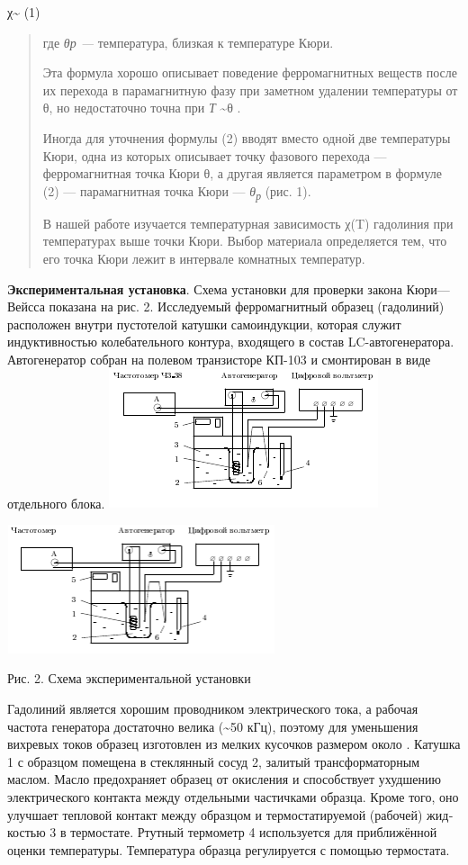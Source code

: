 \documentclass[]{article}
\begin{document}
χ\textasciitilde{} (1)

\begin{quote}
где \emph{θр ---} температура, близкая к температуре Кюри.

Эта формула хорошо описывает поведение ферромагнитных ве­ществ после их
перехода в парамагнитную фазу при заметном удалении температуры от θ, но
недостаточно точна при \emph{Т} \textasciitilde{}θ .

Иногда для уточнения формулы (2) вводят вместо одной две темпе­ратуры
Кюри, одна из которых описывает точку фазового перехода ---
ферромагнитная точка Кюри θ, а другая является параметром в фор­муле (2)
--- парамагнитная точка Кюри --- \emph{θ\textsubscript{р}} (рис. 1).

В нашей работе изучается температурная зависимость χ(T) гадоли­ния при
температурах выше точки Кюри. Выбор материала определяет­ся тем, что его
точка Кюри лежит в интервале комнатных температур.
\end{quote}

\textbf{Экспериментальная установка}. Схема установки для проверки
за­кона Кюри---Вейсса показана на рис. 2. Исследуемый ферромагнитный
образец (гадолиний) расположен внутри пустотелой катушки самоин­дукции,
которая служит индуктивностью колебательного контура, вхо­дящего в
состав LC-автогенератора. Автогенератор собран на полевом транзисторе
КП-103 и смонтирован в виде отдельного блока.
\includegraphics[width=3.11458in,height=1.61458in]{./media/image5.png}

\includegraphics[width=3.10000in,height=1.48542in]{./media/image6.png}

Рис. 2. Схема экспериментальной установки

Гадолиний является хорошим проводником электрического тока, а рабочая
частота генератора достаточно велика (\textasciitilde{}50 кГц), поэтому
для уменьшения вихревых токов образец изготовлен из мелких кусочков
размером около . Катушка 1 с образцом помещена в стеклянный сосуд 2,
залитый трансформаторным маслом. Масло предохраняет об­разец от
окисления и способствует ухудшению электрического контак­та между
отдельными частичками образца. Кроме того, оно улучшает тепловой контакт
между образцом и термостатируемой (рабочей) жид­костью 3 в термостате.
Ртутный термометр 4 используется для прибли­жённой оценки температуры.
Температура образца регулируется с по­мощью термостата.
\end{document}
